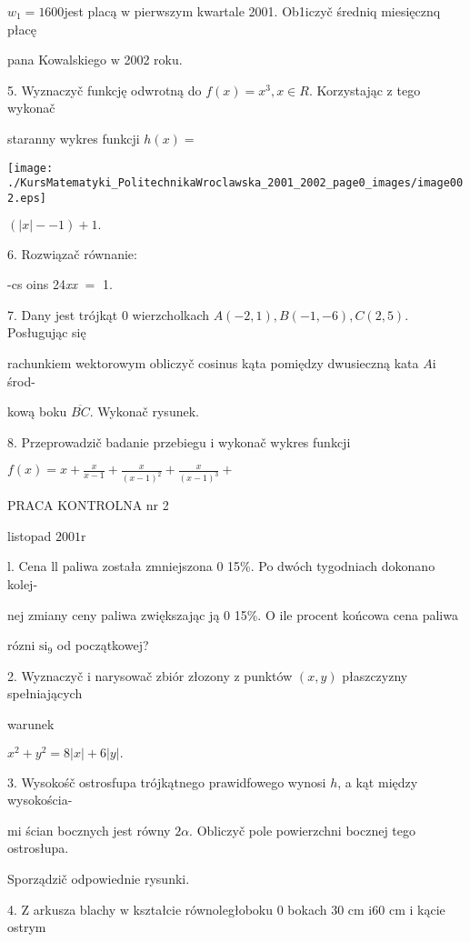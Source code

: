 \documentclass[a4paper,12pt]{article}
\begin{document}
$w_{1}=1600$jest placą $\mathrm{w}$ pierwszym kwartale 2001. Ob1iczyč średniq miesięcznq płacę

pana Kowalskiego $\mathrm{w}$ 2002 roku.

5. Wyznaczyč funkcję odwrotną do $f(x) =x^{3}, x\in R$. Korzystając $\mathrm{z}$ tego wykonač

staranny wykres funkcji $h(x) =$
\begin{center}
\texttt{[image: ./KursMatematyki\_PolitechnikaWroclawska\_2001\_2002\_page0\_images/image002.eps]}
\end{center}
$(|x|-- 1)+1.$

6. Rozwiązač równanie:

-cs  oins 24{\it xx} $=$ 1.

7. Dany jest trójkąt $0$ wierzcholkach $A(-2,1), B(-1,-6), C(2,5)$. Posługując się

rachunkiem wektorowym obliczyč cosinus kąta pomiędzy dwusieczną kata $A\mathrm{i}$ środ-

kową boku $\overline{BC}$. Wykonač rysunek.

8. Przeprowadzič badanie przebiegu $\mathrm{i}$ wykonač wykres funkcji

$f(x)=x+\displaystyle \frac{x}{x-1}+\frac{x}{(x-1)^{2}}+\frac{x}{(x-1)^{3}}+$




PRACA KONTROLNA nr 2

listopad $2001\mathrm{r}$

l. Cena ll paliwa została zmniejszona $0$ 15\%. Po dwóch tygodniach dokonano kolej-

nej zmiany ceny paliwa zwiększając ją $0$ 15\%. $\mathrm{O}$ ile procent końcowa cena paliwa

rózni $\mathrm{s}\mathrm{i}_{9}$ od początkowej?

2. Wyznaczyč $\mathrm{i}$ narysowač zbiór złozony $\mathrm{z}$ punktów $(x,y)$ płaszczyzny spełniających

warunek

$x^{2}+y^{2}=8|x|+6|y|.$

3. Wysokośč ostrosfupa trójkątnego prawidfowego wynosi $h$, a kąt między wysokościa-

mi ścian bocznych jest równy $ 2\alpha$. Obliczyč pole powierzchni bocznej tego ostrosłupa.

Sporządzič odpowiednie rysunki.

4. $\mathrm{Z}$ arkusza blachy $\mathrm{w}$ kształcie równoległoboku $0$ bokach 30 cm $\mathrm{i}60$ cm $\mathrm{i}$ kącie ostrym
\end{document}
